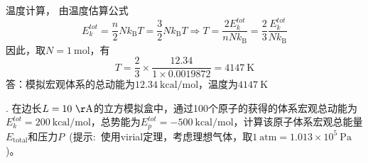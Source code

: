    温度计算，%
   由温度估算公式
   \begin{displaymath}
	   E_k^{tot}=\frac{n}2Nk_{\mathrm{B}}T=\frac32Nk_{\mathrm{B}}T\Rightarrow T=\dfrac{2E_k^{tot}}{nNk_{\mathrm{B}}}=\dfrac23\dfrac{E_k^{tot}}{Nk_{\mathrm{B}}}
   \end{displaymath}
   因此，取$N=1~\mathrm{mol}$，有
   \begin{displaymath}
	   T=\dfrac23\times\dfrac{12.34}{1\times0.0019872}=4147~\mathrm{K}
   \end{displaymath}
   {\heiti 答}：模拟宏观体系的总动能为$12.34~\mathrm{kcal/mol}$，温度为$4147~\mathrm{K}$

{. 在边长$L=10~\mathrm{\AA}$的立方模拟盒中，通过100个原子的获得的体系宏观总动能为$E_k^{tot}=200~\mathrm{kcal/mol}$，总势能为$E_p^{tot}=-500~\mathrm{kcal/mol}$，计算该原子体系宏观总能量$E_{\mathrm{total}}$和压力$P$~(提示:~使用\textrm{virial}定理，考虑理想气体，取$1~\mathrm{atm}=1.013\times10^5~\mathrm{Pa}$)。}

